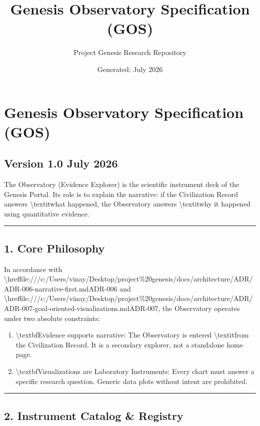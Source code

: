 \documentclass[11pt,a4paper]{article}
\title{\textbf{Genesis Observatory Specification (GOS)}}
\author{Project Genesis Research Repository}
\date{\small Generated: July 2026}
\begin{document}
\maketitle
\thispagestyle{empty}

\newpage
\section*{Genesis Observatory Specification (GOS)}
\subsection*{Version 1.0  July 2026}

The Observatory (Evidence Explorer) is the scientific instrument deck of the Genesis Portal. Its role is to explain the narrative: if the Civilization Record answers \textbackslash{}textit{what} happened, the Observatory answers \textbackslash{}textit{why} it happened using quantitative evidence.

\noindent\rule{\textwidth}{0.4pt}

\subsection*{1. Core Philosophy}

In accordance with \textbackslash{}href{file:///c:/Users/vinay/Desktop/project\%20genesis/docs/architecture/ADR/ADR-006-narrative-first.md}{ADR-006} and \textbackslash{}href{file:///c:/Users/vinay/Desktop/project\%20genesis/docs/architecture/ADR/ADR-007-goal-oriented-visualizations.md}{ADR-007}, the Observatory operates under two absolute constraints:
\begin{enumerate}
  \item \textbackslash{}textbf{Evidence supports narrative}: The Observatory is entered \textbackslash{}textit{from} the Civilization Record. It is a secondary explorer, not a standalone home page.
  \item \textbackslash{}textbf{Visualizations are Laboratory Instruments}: Every chart must answer a specific research question. Generic data plots without intent are prohibited.
\end{enumerate}

\noindent\rule{\textwidth}{0.4pt}

\subsection*{2. Instrument Catalog \& Registry}
\end{document}
